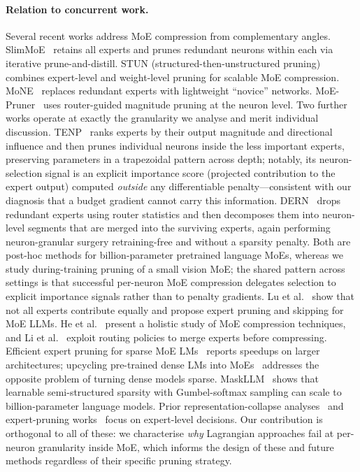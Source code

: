 \documentclass[fleqn,10pt]{article}
\begin{document}
\paragraph{Relation to concurrent work.}
Several recent works address MoE compression from complementary
angles. SlimMoE~\citep{slimmoe2025} retains all experts and prunes
redundant neurons within each via iterative prune-and-distill. STUN
(structured-then-unstructured pruning)~\citep{stun2025} combines
expert-level and weight-level pruning for scalable MoE compression.
MoNE~\citep{mone2025} replaces redundant experts with lightweight
``novice'' networks. MoE-Pruner~\citep{moepruner2025} uses
router-guided magnitude pruning at the neuron level. Two further
works operate at exactly the granularity we analyse and merit
individual discussion. TENP~\citep{tenp2026} ranks experts by their
output magnitude and directional influence and then prunes
individual neurons inside the less important experts, preserving
parameters in a trapezoidal pattern across depth; notably, its
neuron-selection signal is an explicit importance score (projected
contribution to the expert output) computed \emph{outside} any
differentiable penalty---consistent with our diagnosis that a
budget gradient cannot carry this information. DERN~\citep{dern2025}
drops redundant experts using router statistics and then decomposes
them into neuron-level segments that are merged into the surviving
experts, again performing neuron-granular surgery retraining-free
and without a sparsity penalty. Both are post-hoc methods for
billion-parameter pretrained language MoEs, whereas we study
during-training pruning of a small vision MoE; the shared pattern
across settings is that successful per-neuron MoE compression
delegates selection to explicit importance signals rather than to
penalty gradients. Lu et
al.~\citep{lu2024expertslimming} show that not all experts contribute
equally and propose expert pruning and skipping for MoE LLMs. He et
al.~\citep{he2024demystifying} present a holistic study of MoE
compression techniques, and Li et al.~\citep{li2024merge} exploit routing
policies to merge experts before compressing. Efficient expert
pruning for sparse MoE LMs~\citep{liu2024efficient} reports speedups
on larger architectures; upcycling pre-trained dense LMs into
MoEs~\citep{he2025upcycling} addresses the opposite problem of
turning dense models sparse. MaskLLM~\citep{fang2024maskllm} shows
that learnable semi-structured sparsity with Gumbel-softmax sampling
can scale to billion-parameter language models. Prior representation-collapse
analyses~\citep{chi2022representation} and expert-pruning
works~\citep{kim2023mixture} focus on expert-level decisions. Our
contribution is orthogonal to all of these: we characterise
\emph{why} Lagrangian approaches fail at per-neuron granularity
inside MoE, which informs the design of these and future methods
regardless of their specific pruning strategy.
\end{document}
